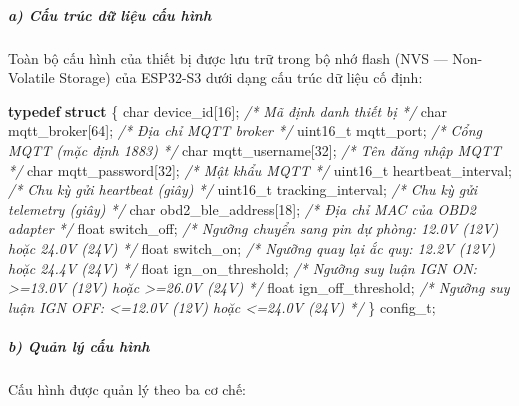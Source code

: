 \documentclass[a4paper]{extarticle}
\newenvironment{Shaded}{}{}
\newcommand{\CommentTok}[1]{\textcolor[rgb]{0.38,0.63,0.69}{\textit{#1}}}
\newcommand{\DataTypeTok}[1]{\textcolor[rgb]{0.56,0.13,0.00}{#1}}
\newcommand{\DecValTok}[1]{\textcolor[rgb]{0.25,0.63,0.44}{#1}}
\newcommand{\KeywordTok}[1]{\textcolor[rgb]{0.00,0.44,0.13}{\textbf{#1}}}
\newcommand{\NormalTok}[1]{#1}
\newcommand{\OperatorTok}[1]{\textcolor[rgb]{0.40,0.40,0.40}{#1}}
\begin{document}
\subparagraph{a) Cấu trúc dữ liệu cấu
hình}\label{a-cux1ea5u-truxfac-dux1eef-liux1ec7u-cux1ea5u-huxecnh}

Toàn bộ cấu hình của thiết bị được lưu trữ trong bộ nhớ flash (NVS ---
Non-Volatile Storage) của ESP32-S3 dưới dạng cấu trúc dữ liệu cố định:

\begin{Shaded}
\begin{Highlighting}[]
\KeywordTok{typedef} \KeywordTok{struct} \OperatorTok{\{}
    \DataTypeTok{char}\NormalTok{     device\_id}\OperatorTok{[}\DecValTok{16}\OperatorTok{];}          \CommentTok{/* Mã định danh thiết bị */}
    \DataTypeTok{char}\NormalTok{     mqtt\_broker}\OperatorTok{[}\DecValTok{64}\OperatorTok{];}        \CommentTok{/* Địa chỉ MQTT broker */}
    \DataTypeTok{uint16\_t}\NormalTok{ mqtt\_port}\OperatorTok{;}              \CommentTok{/* Cổng MQTT (mặc định 1883) */}
    \DataTypeTok{char}\NormalTok{     mqtt\_username}\OperatorTok{[}\DecValTok{32}\OperatorTok{];}      \CommentTok{/* Tên đăng nhập MQTT */}
    \DataTypeTok{char}\NormalTok{     mqtt\_password}\OperatorTok{[}\DecValTok{32}\OperatorTok{];}      \CommentTok{/* Mật khẩu MQTT */}
    \DataTypeTok{uint16\_t}\NormalTok{ heartbeat\_interval}\OperatorTok{;}     \CommentTok{/* Chu kỳ gửi heartbeat (giây) */}
    \DataTypeTok{uint16\_t}\NormalTok{ tracking\_interval}\OperatorTok{;}      \CommentTok{/* Chu kỳ gửi telemetry (giây) */}
    \DataTypeTok{char}\NormalTok{     obd2\_ble\_address}\OperatorTok{[}\DecValTok{18}\OperatorTok{];}   \CommentTok{/* Địa chỉ MAC của OBD2 adapter */}
    \DataTypeTok{float}\NormalTok{    switch\_off}\OperatorTok{;}             \CommentTok{/* Ngưỡng chuyển sang pin dự phòng: 12.0V (12V) hoặc 24.0V (24V) */}
    \DataTypeTok{float}\NormalTok{    switch\_on}\OperatorTok{;}              \CommentTok{/* Ngưỡng quay lại ắc quy: 12.2V (12V) hoặc 24.4V (24V) */}
    \DataTypeTok{float}\NormalTok{    ign\_on\_threshold}\OperatorTok{;}       \CommentTok{/* Ngưỡng suy luận IGN ON: \textgreater{}=13.0V (12V) hoặc \textgreater{}=26.0V (24V) */}
    \DataTypeTok{float}\NormalTok{    ign\_off\_threshold}\OperatorTok{;}      \CommentTok{/* Ngưỡng suy luận IGN OFF: \textless{}=12.0V (12V) hoặc \textless{}=24.0V (24V) */}
\OperatorTok{\}}\NormalTok{ config\_t}\OperatorTok{;}
\end{Highlighting}
\end{Shaded}

\subparagraph{b) Quản lý cấu
hình}\label{b-quux1ea3n-luxfd-cux1ea5u-huxecnh}

Cấu hình được quản lý theo ba cơ chế:
\end{document}
